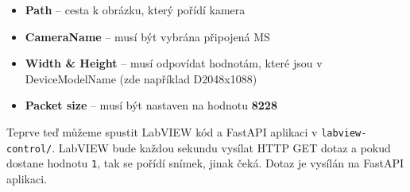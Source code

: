 \documentclass[12pt]{article}
\begin{document}
\begin{teamwork}
        \begin{itemize}
            \item \textbf{Path} – cesta k obrázku, který pořídí kamera
            \item \textbf{CameraName} – musí být vybrána připojená MS
            \item \textbf{Width \& Height} – musí odpovídat hodnotám, které jsou v DeviceModelName (zde například D2048x1088)
            \item \textbf{Packet size} – musí být nastaven na hodnotu \textbf{8228}
        \end{itemize}

        Teprve teď můžeme spustit LabVIEW kód a FastAPI aplikaci v \texttt{labview-control/}.
        LabVIEW bude každou sekundu vysílat HTTP GET dotaz a pokud dostane hodnotu \texttt{1}, tak se pořídí snímek, jinak čeká.
        Dotaz je vysílán na FastAPI aplikaci.
    \end{teamwork}
\end{document}
